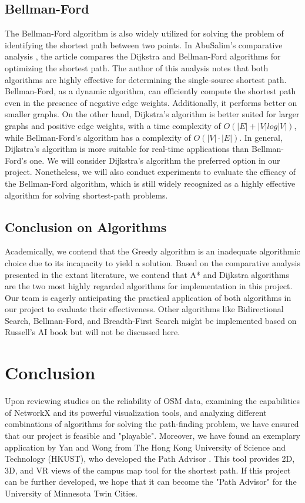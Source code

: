 \documentclass[12pt]{article}
\begin{document}
\subsection{Bellman-Ford}
The Bellman-Ford algorithm is also widely utilized for solving the problem of identifying the shortest path between two points. In AbuSalim's comparative analysis \cite{AbuSalim_Ibrahim_Zainuri_Saringat_Jamel_Abdul_Wahab_2020}, the article compares the Dijkstra and Bellman-Ford algorithms for optimizing the shortest path. The author of this analysis notes that both algorithms are highly effective for determining the single-source shortest path. Bellman-Ford, as a dynamic algorithm, can efficiently compute the shortest path even in the presence of negative edge weights.
Additionally, it performs better on smaller graphs. On the other hand, Dijkstra's algorithm is better suited for larger graphs and positive edge weights, with a time complexity of \(O(|E|+|V|log|V|)\), while Bellman-Ford's algorithm has a complexity of \(O(|V|·|E|)\). In general, Dijkstra's algorithm is more suitable for real-time applications than Bellman-Ford's one. We will consider Dijkstra's algorithm the preferred option in our project. Nonetheless, we will also conduct experiments to evaluate the efficacy of the Bellman-Ford algorithm, which is still widely recognized as a highly effective algorithm for solving shortest-path problems.


\subsection{Conclusion on Algorithms}
Academically, we contend that the Greedy algorithm is an inadequate algorithmic choice due to its incapacity to yield a solution. Based on the comparative analysis presented in the extant literature, we contend that A* and Dijkstra algorithms are the two most highly regarded algorithms for implementation in this project. Our team is eagerly anticipating the practical application of both algorithms in our project to evaluate their effectiveness. Other algorithms like Bidirectional Search, Bellman-Ford, and Breadth-First Search might be implemented based on Russell's AI book \cite{Russell_Norvig_2021} but will not be discussed here. 


\section{Conclusion}
Upon reviewing studies on the reliability of OSM data, examining the capabilities of NetworkX and its powerful visualization tools, and analyzing different combinations of algorithms for solving the path-finding problem, we have ensured that our project is feasible and "playable". Moreover, we have found an exemplary application by Yan and Wong from The Hong Kong University of Science and Technology (HKUST), who developed the Path Advisor \cite{Yan_Wong_2021}. This tool provides 2D, 3D, and VR views of the campus map tool for the shortest path. If this project can be further developed, we hope that it can become the "Path Advisor" for the University of Minnesota Twin Cities. 


\printbibliography
\end{document}
